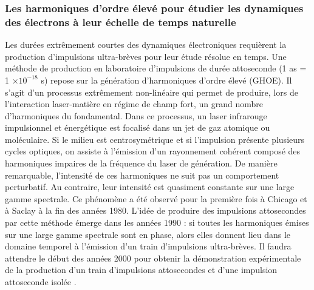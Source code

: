 \subsubsection*{Les harmoniques d'ordre élevé pour étudier les dynamiques des électrons à leur échelle de temps naturelle}
Les durées extrêmement courtes des dynamiques électroniques requièrent la production d'impulsions ultra-brèves pour leur étude résolue en temps. Une méthode de production en laboratoire d'impulsions de durée attoseconde (1 as = 1 $\times 10^{-18}$ s) repose sur la génération d'harmoniques d'ordre élevé (GHOE). Il s’agit d’un processus extrêmement non-linéaire qui permet de produire, lors de l'interaction laser-matière en régime de champ fort, un grand nombre d’harmoniques du fondamental. Dans ce processus, un laser infrarouge impulsionnel et énergétique est focalisé dans un jet de gaz atomique ou moléculaire. Si le milieu est centrosymétrique et si l'impulsion présente plusieurs cycles optiques, on assiste à l'émission d’un rayonnement cohérent composé des harmoniques impaires de la fréquence du laser de génération. De manière remarquable, l’intensité de ces harmoniques ne suit pas un comportement perturbatif. Au contraire, leur intensité est quasiment constante sur une large gamme spectrale. Ce phénomène a été observé pour la première fois à Chicago  et à Saclay  à la fin des années 1980. L'idée de produire des impulsions attosecondes par cette méthode émerge dans les années 1990 : si toutes les harmoniques émises sur une large gamme spectrale sont en phase, alors elles donnent lieu dans le domaine temporel à l'émission d'un train d'impulsions ultra-brèves. Il faudra attendre le début des années 2000 pour obtenir la démonstration expérimentale de la production d'un train d'impulsions attosecondes  et d'une impulsion attoseconde isolée .

